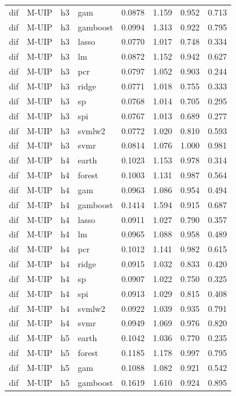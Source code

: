 \begin{ThreePartTable}
\begin{longtable}[t]{llclcccc}
dif & M-UIP & h3 & gam & 0.0878 & 1.159 & 0.952 & 0.713\\
dif & M-UIP & h3 & gamboost & 0.0994 & 1.313 & 0.922 & 0.795\\
dif & M-UIP & h3 & lasso & 0.0770 & 1.017 & 0.748 & 0.334\\
dif & M-UIP & h3 & lm & 0.0872 & 1.152 & 0.942 & 0.627\\
dif & M-UIP & h3 & pcr & 0.0797 & 1.052 & 0.903 & 0.244\\
dif & M-UIP & h3 & ridge & 0.0771 & 1.018 & 0.755 & 0.333\\
dif & M-UIP & h3 & sp & 0.0768 & 1.014 & 0.705 & 0.295\\
dif & M-UIP & h3 & spi & 0.0767 & 1.013 & 0.689 & 0.277\\
dif & M-UIP & h3 & svmlw2 & 0.0772 & 1.020 & 0.810 & 0.593\\
dif & M-UIP & h3 & svmr & 0.0814 & 1.076 & 1.000 & 0.981\\
\addlinespace
dif & M-UIP & h4 & earth & 0.1023 & 1.153 & 0.978 & 0.314\\
dif & M-UIP & h4 & forest & 0.1003 & 1.131 & 0.987 & 0.564\\
dif & M-UIP & h4 & gam & 0.0963 & 1.086 & 0.954 & 0.494\\
dif & M-UIP & h4 & gamboost & 0.1414 & 1.594 & 0.915 & 0.687\\
dif & M-UIP & h4 & lasso & 0.0911 & 1.027 & 0.790 & 0.357\\
dif & M-UIP & h4 & lm & 0.0965 & 1.088 & 0.958 & 0.489\\
dif & M-UIP & h4 & pcr & 0.1012 & 1.141 & 0.982 & 0.615\\
dif & M-UIP & h4 & ridge & 0.0915 & 1.032 & 0.833 & 0.420\\
dif & M-UIP & h4 & sp & 0.0907 & 1.022 & 0.750 & 0.325\\
dif & M-UIP & h4 & spi & 0.0913 & 1.029 & 0.815 & 0.408\\
dif & M-UIP & h4 & svmlw2 & 0.0922 & 1.039 & 0.935 & 0.791\\
dif & M-UIP & h4 & svmr & 0.0949 & 1.069 & 0.976 & 0.820\\
\addlinespace
dif & M-UIP & h5 & earth & 0.1042 & 1.036 & 0.770 & 0.235\\
dif & M-UIP & h5 & forest & 0.1185 & 1.178 & 0.997 & 0.795\\
dif & M-UIP & h5 & gam & 0.1088 & 1.082 & 0.921 & 0.542\\
dif & M-UIP & h5 & gamboost & 0.1619 & 1.610 & 0.924 & 0.895\\

\end{longtable}
\end{ThreePartTable}
